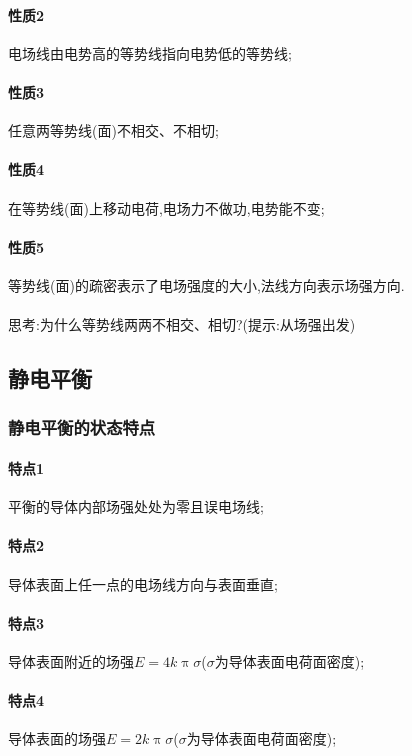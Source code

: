 \paragraph{性质2}\qquad 电场线由电势高的等势线指向电势低的等势线;
\paragraph{性质3}\qquad 任意两等势线(面)不相交、不相切;
\paragraph{性质4}\qquad 在等势线(面)上移动电荷,电场力不做功,电势能不变;
\paragraph{性质5}\qquad 等势线(面)的疏密表示了电场强度的大小,法线方向表示场强方向.\\\\
{ 思考:为什么等势线两两不相交、相切?(提示:从场强出发)}
\subsection{静电平衡}
\subsubsection{静电平衡的状态特点}
\paragraph{特点1}\qquad 平衡的导体内部场强处处为零且误电场线;
\paragraph{特点2}\qquad 导体表面上任一点的电场线方向与表面垂直;
\paragraph{特点3}\qquad 导体表面附近的场强$E=4k\uppi\sigma$($\sigma$为导体表面电荷面密度);
\paragraph{特点4}\qquad 导体表面的场强$E=2k\uppi\sigma$($\sigma$为导体表面电荷面密度);  
\paragraph{}
